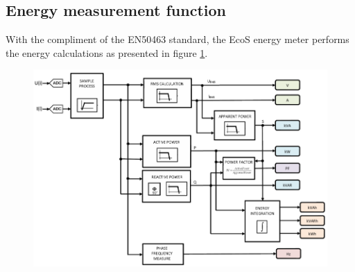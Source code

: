 \subsection{Energy measurement function}
\label{subs:324}

With the compliment of the EN50463 standard, the EcoS energy meter performs the energy calculations as presented in figure \ref{fig:energy_calculation}.

\begin{figure}[h!]
	\centering
	\begin{minipage}{.8\textwidth}
		\centering
		\vspace{-0.5em}
		\includegraphics[width=\textwidth,keepaspectratio]{figures/32.EnergyS/energy_calculation}
		\label{fig:energy_calculation}
				\vspace{-1em}
	\end{minipage}
\end{figure}

